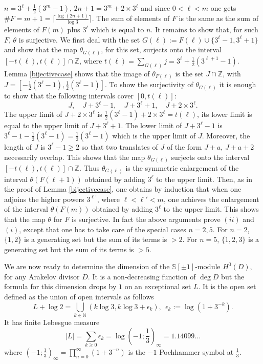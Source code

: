 \documentclass[cupthm]{CUP-JNL-JMJ}
\numberwithin{equation}{section}
\theoremstyle{cupplain}
\theoremstyle{cupdefinition}
\theoremstyle{cupremark}
\theoremstyle{cupproof}
\def\N{{\mathbb N}}
\def\S{{\mathbb S}}
\def\Z{{\mathbb Z}}
\def\sss{{\S}}
\def\spm{{\sss[\pm 1]}}
\begin{document}
$n=3^\ell+\frac{1}{2} \left(3^m-1\right)$, $2n+1=3^m+2\times  3^\ell$ and since $0<\ell<m$ one gets $\#F=m+1=\lceil \frac{\log(2n+1)}{\log 3}\rceil$. The sum of elements of $F$ is the same as the sum of elements of $F(m)$ plus $3^\ell$ which is equal to $n$. It remains to show that, for such $F$,  $\theta$  is surjective. 
We first deal with the set $G(\ell):=F(\ell)\cup \{3^\ell-1,3^\ell+1\}$ and show that the map $\theta_{G(\ell)}$, for this set, surjects onto the interval $[-t(\ell),t(\ell)]\cap \Z$, where $t(\ell)=\sum_{G(\ell)}j=3^\ell+\frac{1}{2}(3^{\ell+1}-1)$. Lemma \ref{bijectivecase} shows that the image of $\theta_{F(\ell)}$ is the set $J\cap \Z$, with $J=[-\frac{1}{2}(3^\ell-1),\frac{1}{2} (3^\ell-1)]$. To show the surjectivity of $\theta_{G(\ell)}$ it is enough to show that the following intervals cover $[0,t(\ell)]$:
\[
J, \quad J+3^\ell-1, \quad J+ 3^\ell+1, \quad J+2\times 3^\ell.
\]
The upper limit of $J+2\times 3^\ell$ is $\frac{1}{2} (3^\ell-1)+2\times 3^\ell=t(\ell)$, its lower limit is equal to the upper limit of $J+ 3^\ell+1$. The lower limit of $J+3^\ell-1$ is $3^\ell-1-\frac{1}{2}(3^\ell-1)= \frac{1}{2}(3^\ell-1)$ which is the upper limit of $J$. Moreover, the length of $J$ is $3^\ell-1\geq 2$ so that two translates of $J$ of the form $J+a$, $J+a +2$ necessarily overlap. This shows that the map $\theta_{G(\ell)}$  surjects onto the interval $[-t(\ell),t(\ell)]\cap \Z$. Thus  $\theta_{G(\ell)}$ is the symmetric enlargement of the interval $\theta(F(\ell+1))$ obtained by adding $3^\ell$ to the upper limit. Then, as in the proof of Lemma \ref{bijectivecase}, one obtains by induction that when one adjoins the higher powers $3^{\ell'}$, where $\ell<\ell'<m$, one achieves the enlargement of the interval $\theta(F(m))$ obtained by adding $3^{\ell}$ to the upper limit. This shows that the map $\theta$ for $F$ is surjective. In fact the above arguments prove $(ii)$ and $(i)$, except that one has to take care of the special cases $n=2,5$. For $n=2$,  $\{1,2\}$ is a generating set but the sum of its terms is $>2$. For $n=5$,   $\{1,2,3\}$ is a generating set but the sum of its terms is $>5$.  \endproof 




We are now ready to determine the dimension of the $\spm$-module $H^0(D)$, for any Arakelov divisor $D$. It is a non-decreasing function of $\deg D$ but the formula for this dimension drops by $1$ on an exceptional set $L$.   It is the open set defined as the union of open intervals as follows 
\begin{equation}\label{excL}
	L+ \log 2=\bigcup_{k\in \N} (k\log 3,k\log 3+\epsilon_k), \ \ \epsilon_k:=\log(1+3^{-k}).
\end{equation}
It has finite Lebesgue measure
\[
 \vert L\vert=\sum_{k\geq 0}  \epsilon_k=\log \left(-1;\frac{1}{3}\right)_{\infty }= 1.14099\ldots
\]
where $\left(-1;\frac{1}{3}\right)_{\infty }=\prod_{n=0}^\infty (1+3^{-n})$ is the $-1$ Pochhammer symbol at $\frac 13$.
\end{document}
